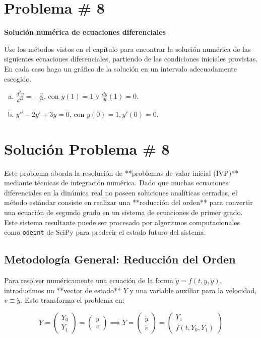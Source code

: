 \documentclass[a4paper]{article}
\begin{document}
\section{Problema \# 8}

\textbf{Solución numérica de ecuaciones diferenciales}

Use los métodos vistos en el capítulo para encontrar la solución numérica de las siguientes ecuaciones diferenciales, partiendo de las condiciones iniciales provistas. En cada caso haga un gráfico de la solución en un intervalo adecuadamente escogido.

\begin{enumerate}[a)]
    \item $ \frac{d^2y}{dt^2} = -\frac{y}{t^2} $, con $ y(1) = 1 $ y $ \frac{dy}{dt}(1) = 0 $.
    \item $ y'' - 2y' + 3y = 0 $, con $ y(0) = 1, y'(0) = 0 $.
\end{enumerate}

\section*{Solución Problema \# 8}

Este problema aborda la resolución de **problemas de valor inicial (IVP)** mediante técnicas de integración numérica. Dado que muchas ecuaciones diferenciales en la dinámica real no poseen soluciones analíticas cerradas, el método estándar consiste en realizar una **reducción del orden** para convertir una ecuación de segundo grado en un sistema de ecuaciones de primer grado. Este sistema resultante puede ser procesado por algoritmos computacionales como \texttt{odeint} de SciPy para predecir el estado futuro del sistema.

\subsection{Metodología General: Reducción del Orden}

Para resolver numéricamente una ecuación de la forma $ \ddot{y} = f(t, y, \dot{y}) $, introducimos un **vector de estado** $ Y $ y una variable auxiliar para la velocidad, $ v \equiv \dot{y} $. Esto transforma el problema en:

$$ Y = \begin{pmatrix} Y_0 \\ Y_1 \end{pmatrix} = \begin{pmatrix} y \\ v \end{pmatrix} \implies \dot{Y} = \begin{pmatrix} \dot{y} \\ \dot{v} \end{pmatrix} = \begin{pmatrix} Y_1 \\ f(t, Y_0, Y_1) \end{pmatrix} $$
\end{document}
